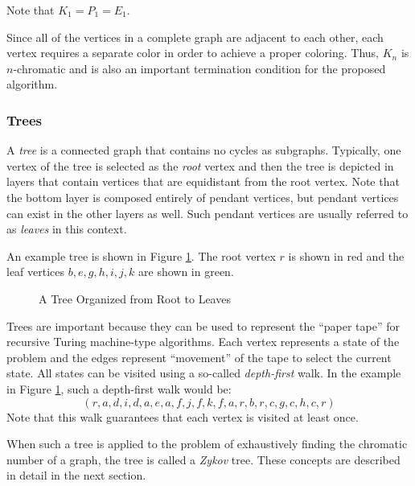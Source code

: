 Note that \(K_1=P_1=E_1\).

Since all of the vertices in a complete graph are adjacent to each other, each vertex requires a separate color in
order to achieve a proper coloring.  Thus, \(K_n\) is \(n\)-chromatic and is also an important termination
condition for the proposed algorithm.

\subsubsection{Trees}

A \emph{tree} is a connected graph that contains no cycles as subgraphs.  Typically, one vertex of the tree is
selected as the \emph{root} vertex and then the tree is depicted in layers that contain vertices that are
equidistant from the root vertex.  Note that the bottom layer is composed entirely of pendant vertices, but pendant
vertices can exist in the other layers as well.  Such pendant vertices are usually referred to as \emph{leaves} in
this context.

An example tree is shown in Figure \ref{fig:tree}.  The root vertex \(r\) is shown in red and the leaf vertices
\(b,e,g,h,i,j,k\) are shown in green.

\begin{figure}
  \label{fig:tree}
  \begin{center}
  \end{center}
  \caption{A Tree Organized from Root to Leaves}
\end{figure}

Trees are important because they can be used to represent the ``paper tape'' for recursive Turing machine-type
algorithms.  Each vertex represents a state of the problem and the edges represent ``movement'' of the tape to
select the current state.  All states can be visited using a so-called \emph{depth-first} walk.  In the example
in Figure \ref{fig:tree}, such a depth-first walk would be:
\[(r,a,d,i,d,a,e,a,f,j,f,k,f,a,r,b,r,c,g,c,h,c,r)\]
Note that this walk guarantees that each vertex is visited at least once.

When such a tree is applied to the problem of exhaustively finding the chromatic number of a graph, the tree is
called a \emph{Zykov} tree.  These concepts are described in detail in the next section.
